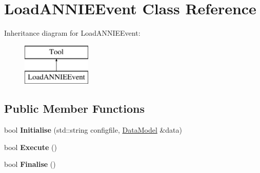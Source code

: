 \hypertarget{classLoadANNIEEvent}{\section{Load\-A\-N\-N\-I\-E\-Event Class Reference}
\label{classLoadANNIEEvent}
}
Inheritance diagram for Load\-A\-N\-N\-I\-E\-Event\-:\begin{figure}[H]
\begin{center}
\leavevmode
\includegraphics[height=2.000000cm]{classLoadANNIEEvent}
\end{center}
\end{figure}
\subsection*{Public Member Functions}
\begin{DoxyCompactItemize}
\item 
\hypertarget{classLoadANNIEEvent_a273ac2b597344b138ff0142fa24bff06}{bool {\bfseries Initialise} (std\-::string configfile, \hyperlink{classDataModel}{Data\-Model} \&data)}\label{classLoadANNIEEvent_a273ac2b597344b138ff0142fa24bff06}

\item 
\hypertarget{classLoadANNIEEvent_af2c0686e7625d6a8ab5ebd692e78b182}{bool {\bfseries Execute} ()}\label{classLoadANNIEEvent_af2c0686e7625d6a8ab5ebd692e78b182}

\item 
\hypertarget{classLoadANNIEEvent_afcee0c0da54733f0c3dadb8c8879f494}{bool {\bfseries Finalise} ()}\label{classLoadANNIEEvent_afcee0c0da54733f0c3dadb8c8879f494}

\end{DoxyCompactItemize}
